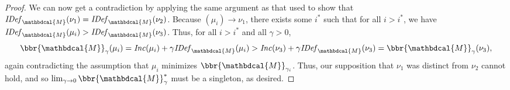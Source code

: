\documentclass[letterpaper]{article} %
\theoremstyle{plain}
\theoremstyle{definition}
\theoremstyle{remark}
\newcommand{\dg}[1]{\mathbdcal{#1}}
\newcommand{\IDef}[1]{\mathit{IDef}_{#1}}
\newcommand\Inc{\mathit{Inc}}
\begin{document}
\begin{proof}
We can now get a contradiction by applying the same argument as that used to show
that $\IDef{\dg M}(\nu_1) =\IDef{\dg M}(\nu_2)$.  
    Because $(\mu_{i}) \to \nu_1$, there exists some
    $i^*$ such that for all $i > i^*$, we have $\IDef{\dg M}(\mu_{i}) >
    \IDef{\dg M}(\nu_3)$. Thus, for all $i > i^*$ and all
    $\gamma > 0$, 
    \[ \bbr{\dg M}_\gamma(\mu_{i}) = \Inc(\mu_{i}) + \gamma\IDef{\dg M}(\mu_{i}) > \Inc(\nu_3) 
    + \gamma \IDef{\dg M}(\nu_3) = \bbr{\dg M}_\gamma(\nu_3),\]
again contradicting the assumption that $\mu_{i}$ minimizes
$\bbr{\dg M}_{\gamma_{i}}$.
% 
%
Thus, our supposition that $\nu_1$ was distinct from $\nu_2$ cannot hold, and so
$\lim_{\gamma \to 0}\bbr{\dg M}_\gamma^*$ must be a singleton, as desired.
\end{proof}
\end{document}
